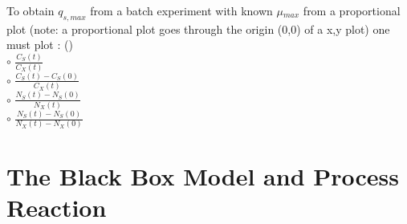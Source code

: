\documentclass[]{beamer}
\begin{document}
\begin{frame}[shrink] {} 
\color{blue}
    
 To obtain $q_{s,max}$ from a batch experiment with known $\mu$$_{max}$ from a proportional plot (note: a proportional plot goes through the origin (0,0) of a x,y plot) one must plot :  ({\color{red}{Q11}})\\[0.5em]
\color{black}
\setlength{\parindent}{-0.4cm}
{\color{red}$\circ$} $\frac{C_S(t)}{C_X(t)}$  \\[0.3em]
{\color{red}$\circ$} $\frac{C_S(t)-C_S(0)}{C_X(t)}$  \\[0.3em]
{\color{red}$\circ$} $\frac{N_S(t)-N_S(0)}{N_X(t)}$  \\[0.3em]
{\color{red}$\circ$} $\frac{N_S(t)-N_S(0)}{N_X(t)-N_X(0)}$  \\[0.3em]
\end{frame}


\section{The Black Box Model and Process Reaction}
\end{document}
